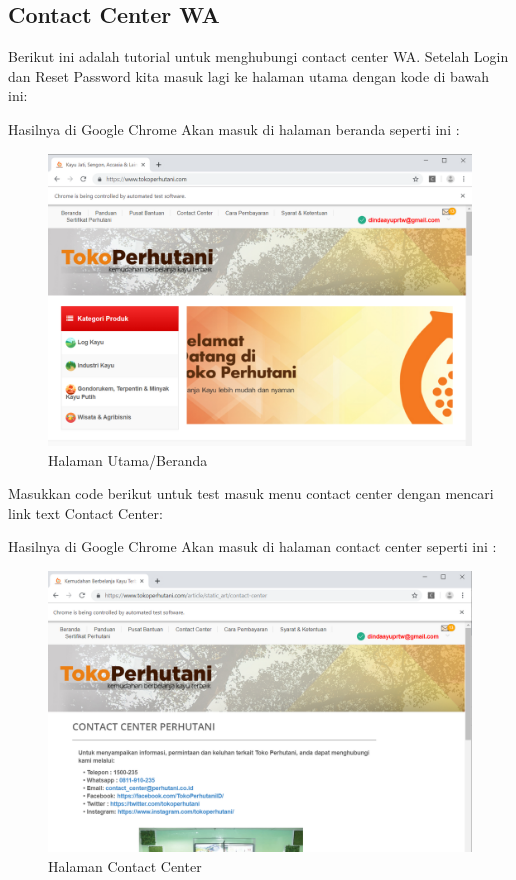 \newpage
\subsection{Contact Center WA}
Berikut ini adalah tutorial untuk menghubungi contact center WA. Setelah Login dan Reset Password kita masuk lagi ke halaman utama dengan kode di bawah ini:



Hasilnya  di Google Chrome Akan masuk di halaman beranda seperti ini : 

\begin{figure}[h]
	\centering
	\includegraphics[scale=0.28]{figures/3HalUtama}
	\caption{Halaman Utama/Beranda}
\end{figure}

Masukkan code berikut untuk test masuk menu contact center dengan mencari link text Contact Center:



Hasilnya  di Google Chrome Akan masuk di halaman contact center seperti ini : 

\begin{figure}[h]
	\centering
	\includegraphics[scale=0.27]{figures/5kontak}
	\caption{Halaman Contact Center}
\end{figure}

